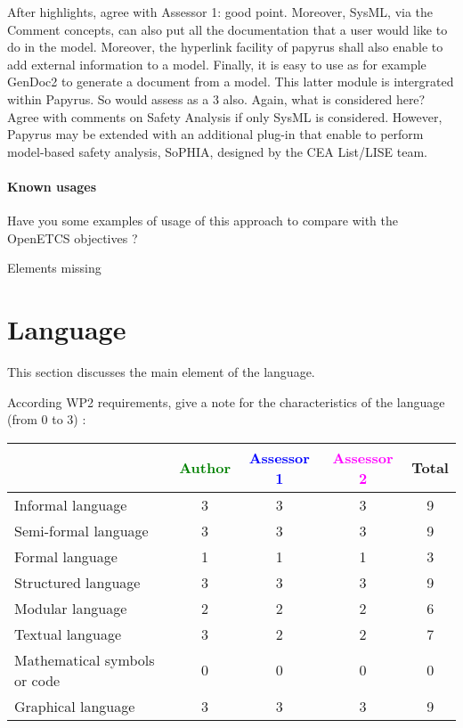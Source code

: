 \begin{author_comment}
After highlights, agree with Assessor 1: good point.
Moreover, SysML, via the Comment concepts, can also put all the documentation that a user would like to do in the model. Moreover, the hyperlink facility of papyrus shall also enable to add external information to a model. Finally, it is easy to use as for example GenDoc2 to generate a document from a model. This latter module is intergrated within Papyrus.
So would assess as a 3 also.
Again, what is considered here? Agree with comments on Safety Analysis if only SysML is considered. However, Papyrus may be extended with an additional plug-in that enable to perform model-based safety analysis, SoPHIA, designed by the CEA List/LISE team.
\end{author_comment}

\paragraph{Known usages} Have you some examples of usage of this approach to compare with the OpenETCS objectives ?

\begin{assessor2}
Elements missing
\end{assessor2}


\section{Language}
This section discusses the main element of the language.

According WP2 requirements, give a note for the characteristics of the language (from 0 to 3) :

\begin{tabular}{|l | c | c | c | c|}
\hline
& \textcolor{green}{Author} & \textcolor{blue}{Assessor 1} & \textcolor{magenta}{Assessor 2} & Total \\
\hline
Informal language & 3 & 3 & 3 & 9 \\
\hline
Semi-formal language & 3 & 3 & 3 & 9 \\
\hline
Formal language & 1 & 1 & 1 & 3 \\
\hline
Structured language & 3 & 3 & 3 & 9 \\
\hline
Modular language & 2 & 2 & 2 & 6 \\
\hline
Textual language & 3 & 2 & 2 & 7 \\
\hline
Mathematical symbols or code & 0 & 0 & 0  & 0 \\
\hline
Graphical language & 3 & 3 & 3 & 9 \\
\hline
\end{tabular}

